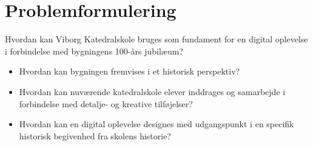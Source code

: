 \section{Problemformulering}

Hvordan kan Viborg Katedralskole bruges som fundament for en digital oplevelse i forbindelse med bygningens 100-års jubilæum?

\begin{itemize}
    \item Hvordan kan bygningen fremvises i et historisk perspektiv?
    \item Hvordan kan nuværende katedralskole elever inddrages og samarbejde i forbindelse med detalje- og kreative tilføjelser?
    \item Hvordan kan en digital oplevelse designes med udgangspunkt i en specifik historisk begivenhed fra skolens historie?
\end{itemize}

